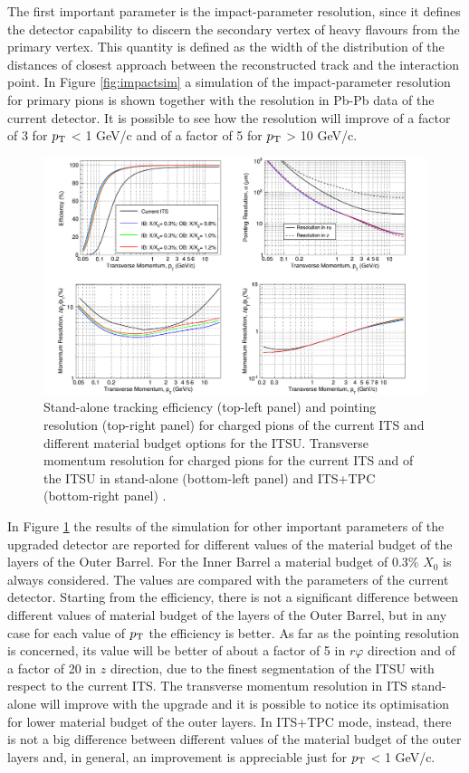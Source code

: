 %
The first important parameter is the impact-parameter resolution, since it defines the detector capability to discern the secondary vertex of heavy flavours from the primary vertex. This quantity is defined as the width of the distribution of the distances of closest approach between the reconstructed track and the interaction point. In Figure \ref{fig:impactsim} a simulation of the impact-parameter resolution for primary pions is shown together with the resolution in Pb-Pb data of the current detector. It is possible to see how the resolution will improve of a factor of 3 for $p_\text{T}$ < 1 GeV/c and of a factor of 5 for $p_\text{T}$ > 10 GeV/c.\\
%
\begin{figure}
  \centering
  \includegraphics[scale=0.4]{figures/upperf.png}
  \caption{Stand-alone tracking efficiency (top-left panel) and pointing resolution (top-right panel) for charged pions of the current ITS and different material budget options for the ITSU. Transverse momentum resolution for charged pions for the current ITS and of the ITSU in stand-alone (bottom-left panel) and ITS+TPC (bottom-right panel) \cite{uptdr}.}
  \label{fig:upperf}
\end{figure}
%
In Figure \ref{fig:upperf} the results of the simulation for other important parameters of the upgraded detector are reported for different values of the material budget of the layers of the Outer Barrel. For the Inner Barrel a material budget of 0.3\% $X_0$ is always considered. The values are compared with the parameters of the current detector. Starting from the efficiency, there is not a significant difference between different values of material budget of the layers of the Outer Barrel, but in any case for each value of $p_\text{T}$ the efficiency is better. As far as the pointing resolution is concerned, its value will be better of about a factor of 5 in $r\varphi$ direction and of a factor of 20 in $z$ direction, due to the finest segmentation of the ITSU with respect to the current ITS.  The transverse momentum resolution in ITS stand-alone will improve with the upgrade and it is possible to notice its optimisation for lower material budget of the outer layers. In ITS+TPC mode, instead, there is not a big difference between different values of the material budget of the outer layers and, in general, an improvement is appreciable just for $p_\text{T}$ < 1 GeV/c.
